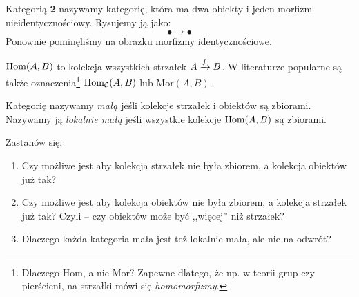 \begin{exmp}
  \label{exmp:dwa}
  Kategorią \textbf{2} nazywamy kategorię, która ma dwa obiekty i jeden morfizm nieidentycznościowy. Rysujemy ją jako:
  $$\bullet \rightarrow \bullet$$
  Ponownie pominęliśmy na obrazku morfizmy identycznościowe.
\end{exmp}

\begin{nott}
  $\Mor AB$ to kolekcja wszystkich strzałek $\morpharr fAB$. W literaturze popularne są także oznaczenia\footnote{Dlaczego Hom, a nie Mor? Zapewne dlatego, że np. w teorii grup czy pierścieni, na strzałki mówi się \emph{homomorfizmy}.} $\bareMor_\C(A, B)$ lub $\mathrm{Mor}(A, B)$.
\end{nott}

\begin{defn}
  Kategorię nazywamy \emph{małą} jeśli kolekcje strzałek i obiektów są zbiorami.
  Nazywamy ją \emph{lokalnie małą} jeśli wszystkie kolekcje $\Mor AB$ są zbiorami.
\end{defn}

\begin{exc}
  Zastanów się:
  \begin{enumerate}
    \item Czy możliwe jest aby kolekcja strzałek nie była zbiorem, a kolekcja obiektów już tak?
    \item Czy możliwe jest aby kolekcja obiektów nie była zbiorem, a kolekcja strzałek już tak? Czyli -- czy obiektów może być ,,więcej'' niż strzałek?
    \item Dlaczego każda kategoria mała jest też lokalnie mała, ale nie na odwrót?
  \end{enumerate}
\end{exc}



